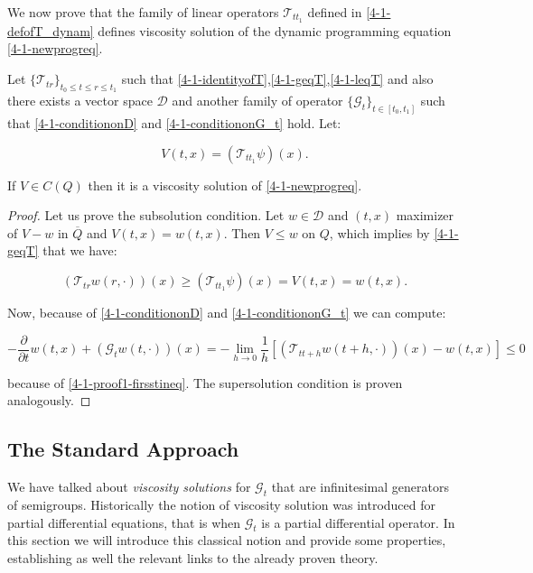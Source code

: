 We now prove that the family of linear operators $\mathcal{T}_{tt_1}$ defined in \ref{4-1-defofT_dynam} defines viscosity solution of the dynamic programming 
equation \ref{4-1-newprogreq}.

\begin{theorem}\label{4-1-thm:Vtoviscosity}
    Let $\{\mathcal{T}_{tr}\}_{t_0\leq t\leq r\leq t_1}$ such that \ref{4-1-identityofT},\ref{4-1-geqT},\ref{4-1-leqT} and also there exists a vector space 
    $\mathcal{D}$ and another family of operator $\{\mathcal{G}_t\}_{t\in[t_0,t_1]}$ such that \ref{4-1-conditiononD} and \ref{4-1-conditiononG_t} hold. Let:
    
    \[V(t,x)=\left(\mathcal{T}_{tt_1}\psi\right)(x).\]

    If $V\in C(Q)$ then it is a viscosity solution of \ref{4-1-newprogreq}.

    \begin{proof}
        Let us prove the subsolution condition. Let $w\in\mathcal{D}$ and $(t,x)$ maximizer of $V-w$ in $\overline{Q}$ and $V(t,x)=w(t,x)$. Then $V\leq w$ on 
        $Q$, which implies by \ref{4-1-geqT} that we have:
        
        \begin{equation}\label{4-1-proof1-firsstineq}(\mathcal{T}_{tr}w(r,\cdot))(x) \geq (\mathcal{T}_{tt_1}\psi)(x) = V(t,x) = w(t,x).\end{equation}

        Now, because of \ref{4-1-conditiononD} and \ref{4-1-conditiononG_t} we can compute:
        
        \[-\frac{\partial}{\partial t}w(t,x) + (\mathcal{G}_tw(t,\cdot))(x) = - \lim_{h\to0} \frac{1}{h}\left[(\mathcal{T}_{tt+h}w(t+h,\cdot))(x)-w(t,x)\right]\leq0\]

        because of \ref{4-1-proof1-firsstineq}. The supersolution condition is proven analogously.
    \end{proof}
\end{theorem}

\subsection{The Standard Approach}

We have talked about \textit{viscosity solutions} for $\mathcal{G}_t$ that are infinitesimal generators of semigroups. Historically the notion of viscosity solution was introduced 
for partial differential equations, that is when $\mathcal{G}_t$ is a partial differential operator. In this section we will introduce this classical notion and provide some properties, 
establishing as well the relevant links to the already proven theory. 

